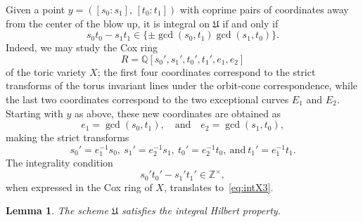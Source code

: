 \documentclass[a4paper, twoside, 11pt]{amsart}
\newtheorem{lemma}[theorem]{Lemma}
\theoremstyle{definition}
\newcommand{\mU}{\mathfrak{U}}
\newcommand{\QQ}{\mathbb{Q}}
\newcommand{\ZZ}{\mathbb{Z}}
\begin{document}
    Given a point $y=([s_0:s_1],\,[t_0:t_1])$ with coprime pairs of coordinates away from the center of the blow up, it is integral on $\mU$ if and only if 
	\begin{equation}\label{eq:intX3}
		s_0t_0-s_1t_1 \in \{\pm \gcd(s_0,t_1)\gcd(s_1,t_0)\}.
	\end{equation}
	Indeed, we may study the Cox ring
	\begin{equation*}
		R = \QQ[s_0',s_1',t_0',t_1',e_1,e_2]
	\end{equation*}
	of the toric variety $X$; the first four coordinates correspond to the strict transforms of the torus invariant lines under the orbit-cone correspondence, while the last two coordinates correspond to the two exceptional curves $E_1$ and $E_2$. Starting with $y$ as above, these new coordinates are obtained as
	\begin{equation*}
		e_1 = \gcd(s_0,t_1),\quad \text{and}\quad e_2 = \gcd(s_1,t_0),
	\end{equation*}
	making the strict transforms
	\begin{equation*}
		s_0' = e_1^{-1}s_0,\ s_1' = e_2^{-1}s_1,\ t_0' = e_2^{-1}t_0,\ \text{and}\ t_1' = e_1^{-1}t_1.
	\end{equation*}
	The integrality condition \begin{equation}\label{eq:intX3prime}
	    s_0't_0' - s_1't_1'\in \ZZ^\times, 
	\end{equation}
	when expressed in the Cox ring of $X$, translates to~\eqref{eq:intX3}.
\begin{lemma}
    The scheme $\mU$ satisfies the integral Hilbert property.
\end{lemma}
\end{document}
